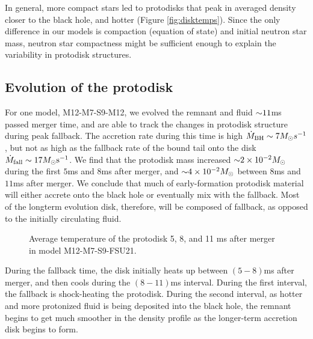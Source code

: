 In general, more compact stars led to protodisks that peak in averaged density closer to the black hole, and hotter (Figure \ref{fig:disktemps}).
Since the only difference in our models is compaction (equation of state) and initial neutron star mass,
neutron star compactness might be sufficient enough to explain the variability in protodisk structures. 

\subsection{Evolution of the protodisk}

For one model, M12-M7-S9-M12, we evolved the remnant and fluid $\mathord{\sim} 11$ms passed merger time, and are able to track the changes in protodisk structure during peak fallback.
The accretion rate during this time is high $\dot{M}_{\rm BH} \sim 7 M_\odot s^{-1}$, but not as high as the fallback rate of the bound tail onto the disk $\dot{M}_{\rm fall} \sim 17 M_\odot {\rm s}^{-1}$.
We find that the protodisk mass increased $\mathord{\sim} 2 \times 10^{-2} M_\odot$ during the first $5$ms and $8$ms after merger, and $\mathord{\sim}4 \times 10^{-2} M_\odot$ between $8$ms and $11$ms after merger.
We conclude that much of early-formation protodisk material will either accrete onto the black hole or eventually mix with the fallback.
Most of the longterm evolution disk, therefore, will be composed of fallback, as opposed to the initially circulating fluid.

\begin{figure}
	\centering
	
	\caption[Average temperature of the protodisks 5, 8, and 11 ms after merger]{
		Average temperature of the protodisk 5, 8, and 11 ms after merger in model M12-M7-S9-FSU21.
	}
	\label{fig:longdiskentropies}
\end{figure}

During the fallback time, the disk initially heats up between $(5-8)$ms after merger, and then cools during the $(8-11)$ms interval. 
During the first interval, the fallback is shock-heating the protodisk.
During the second interval, 
as hotter and more protonized fluid is being deposited into the black hole,
the remnant begins to get much smoother in the density profile as the longer-term  accretion disk begins to form.

